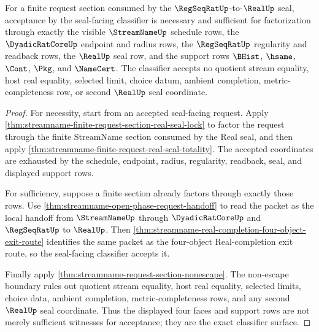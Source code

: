 \begin{theorem}
\label{thm:streamname-finite-request-real-seal-classifier-exactness}
For a finite request section consumed by the
$\RegSeqRatUp$-to-$\RealUp$ seal, acceptance by the seal-facing classifier is
necessary and sufficient for factorization through exactly the visible
$\StreamNameUp$ schedule rows, the $\DyadicRatCoreUp$ endpoint and radius
rows, the $\RegSeqRatUp$ regularity and readback rows, the $\RealUp$ seal row,
and the support rows $\BHist$, $\hsame$, $\Cont$, $\Pkg$, and $\NameCert$.
The classifier accepts no quotient stream equality, host real equality,
selected limit, choice datum, ambient completion, metric-completeness row, or
second $\RealUp$ seal coordinate.
\end{theorem}
\begin{proof}
For necessity, start from an accepted seal-facing request. Apply
\autoref{thm:streamname-finite-request-section-real-seal-lock} to factor the
request through the finite StreamName section consumed by the Real seal, and
then apply \autoref{thm:streamname-finite-request-real-seal-totality}. The
accepted coordinates are exhausted by the schedule, endpoint, radius,
regularity, readback, seal, and displayed support rows.

For sufficiency, suppose a finite section already factors through exactly
those rows. Use \autoref{thm:streamname-open-phase-request-handoff} to read the
packet as the local handoff from $\StreamNameUp$ through $\DyadicRatCoreUp$ and
$\RegSeqRatUp$ to $\RealUp$. Then
\autoref{thm:streamname-real-completion-four-object-exit-route} identifies the
same packet as the four-object Real-completion exit route, so the
seal-facing classifier accepts it.

Finally apply \autoref{thm:streamname-request-section-nonescape}. The
non-escape boundary rules out quotient stream equality, host real equality,
selected limits, choice data, ambient completion, metric-completeness rows, and
any second $\RealUp$ seal coordinate. Thus the displayed four faces and support
rows are not merely sufficient witnesses for acceptance; they are the exact
classifier surface.
\end{proof}

